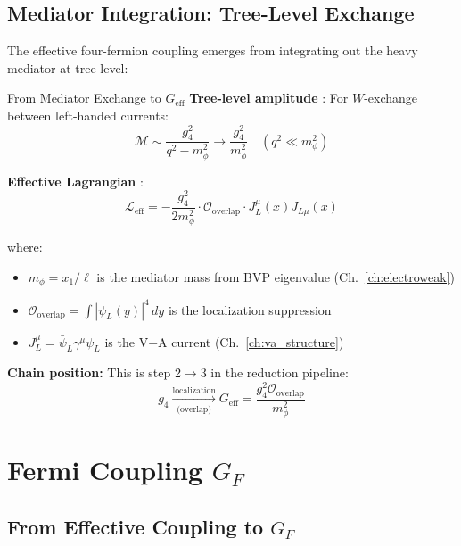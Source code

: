 \subsection{Mediator Integration: Tree-Level Exchange}

The effective four-fermion coupling emerges from integrating out the heavy mediator
at tree level:

\begin{mechanism}{From Mediator Exchange to $G_{\text{eff}}$}
\textbf{Tree-level amplitude} \tagDc{}:
For $W$-exchange between left-handed currents:
\begin{equation}
\mathcal{M} \sim \frac{g_4^2}{q^2 - m_\phi^2} \to \frac{g_4^2}{m_\phi^2} \quad (q^2 \ll m_\phi^2)
\end{equation}

\textbf{Effective Lagrangian} \tagDc{}:
\begin{equation}
\mathcal{L}_{\text{eff}} = -\frac{g_4^2}{2m_\phi^2} \cdot \mathcal{O}_{\text{overlap}} \cdot J_L^\mu(x) J_{L\mu}(x)
\label{eq:L_eff_mediator}
\end{equation}

where:
\begin{itemize}[nosep]
\item $m_\phi = x_1/\ell$ is the mediator mass from BVP eigenvalue (Ch.~\ref{ch:electroweak})
\item $\mathcal{O}_{\text{overlap}} = \int |\psi_L(y)|^4 \, dy$ is the localization suppression
\item $J_L^\mu = \bar\psi_L \gamma^\mu \psi_L$ is the V$-$A current (Ch.~\ref{ch:va_structure})
\end{itemize}

\textbf{Chain position:} This is step 2$\to$3 in the reduction pipeline:
\[
g_4 \xrightarrow[\text{(overlap)}]{\text{localization}} G_{\text{eff}} = \frac{g_4^2 \mathcal{O}_{\text{overlap}}}{m_\phi^2}
\]
\end{mechanism}

\section{Fermi Coupling $G_F$}
\label{sec:gf_derivation}

\subsection{From Effective Coupling to $G_F$}


